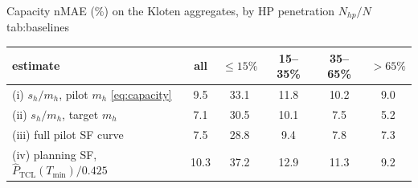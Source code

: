 \begin{autotable}{Capacity nMAE (\%) on the Kloten aggregates, by HP penetration $N_{hp}/N$}{tab:baselines}
\setlength{\tabcolsep}{2.5pt}
\begin{tabular}{lccccc}
\toprule
estimate & all & $\le 15\%$ & 15--35\% & 35--65\% & $> 65\%$ \\
\midrule
(i) $s_h/m_h$, pilot $m_h$ \eqref{eq:capacity} & 9.5 & 33.1 & 11.8 & 10.2 & 9.0 \\
(ii) $s_h/m_h$, target $m_h$ & 7.1 & 30.5 & 10.1 & 7.5 & 5.2 \\
(iii) full pilot SF curve & 7.5 & 28.8 & 9.4 & 7.8 & 7.3 \\
(iv) planning SF, $\hat{P}_{\mathrm{TCL}}(T_{\min})/0.425$ & 10.3 & 37.2 & 12.9 & 11.3 & 9.2 \\
\bottomrule
\end{tabular}
\end{autotable}